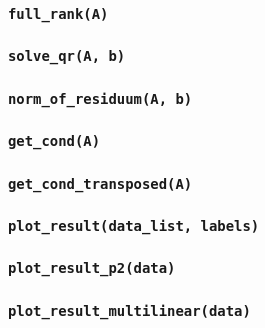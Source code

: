 \documentclass[smallheadings]{scrartcl}
\begin{document}
\subsubsection{\texttt{full\_rank(A)}}

\subsubsection{\texttt{solve\_qr(A, b)}}

\subsubsection{\texttt{norm\_of\_residuum(A, b)}}

\subsubsection{\texttt{get\_cond(A)}}

\subsubsection{\texttt{get\_cond\_transposed(A)}}

\subsubsection{\texttt{plot\_result(data\_list, labels)}}

\subsubsection{\texttt{plot\_result\_p2(data)}}

\subsubsection{\texttt{plot\_result\_multilinear(data)}}
\end{document}
